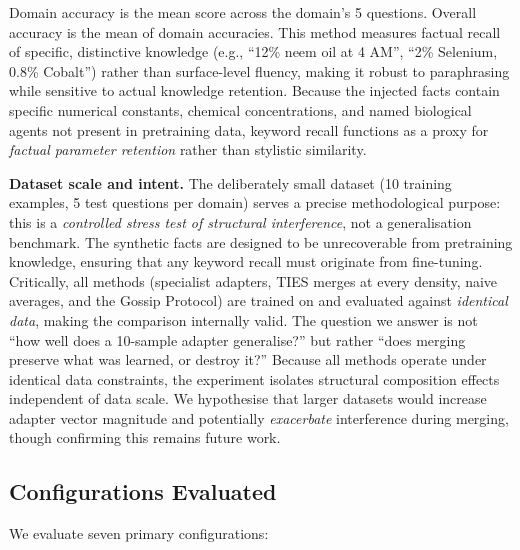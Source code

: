 \documentclass[conference, 10pt]{IEEEtran}
\begin{document}
\noindent Domain accuracy is the mean score across the domain's 5
questions. Overall accuracy is the mean of domain accuracies.
This method measures factual recall of specific, distinctive knowledge
(e.g., ``12\% neem oil at 4 AM'', ``2\% Selenium, 0.8\% Cobalt'')
rather than surface-level fluency, making it robust to paraphrasing
while sensitive to actual knowledge retention.
Because the injected facts contain specific numerical constants,
chemical concentrations, and named biological agents not present in
pretraining data, keyword recall functions as a proxy for
\emph{factual parameter retention} rather than stylistic similarity.

\textbf{Dataset scale and intent.}
The deliberately small dataset (10 training examples, 5 test questions
per domain) serves a precise methodological purpose: this is a
\emph{controlled stress test of structural interference}, not a
generalisation benchmark.
The synthetic facts are designed to be unrecoverable from pretraining
knowledge, ensuring that any keyword recall must originate from
fine-tuning.
Critically, all methods (specialist adapters, TIES merges at every
density, naive averages, and the Gossip Protocol) are trained on and
evaluated against \emph{identical data}, making the comparison
internally valid.
The question we answer is not ``how well does a 10-sample adapter
generalise?'' but rather ``does merging preserve what was learned,
or destroy it?''
Because all methods operate under identical data constraints, the
experiment isolates structural composition effects independent of
data scale.
We hypothesise that larger datasets would increase adapter vector
magnitude and potentially \emph{exacerbate} interference during
merging, though confirming this remains future work.

\subsection{Configurations Evaluated}

We evaluate seven primary configurations:
\end{document}

